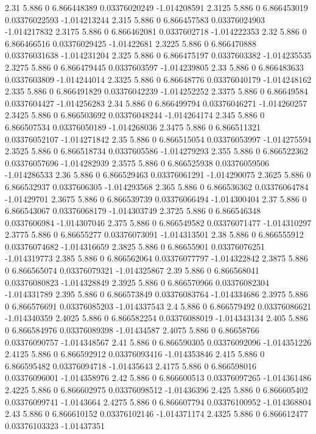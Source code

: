 {2.31 5.886 0 6.866448389 0.03376020249 -1.014208591
2.3125 5.886 0 6.866453019 0.03376022593 -1.014213244
2.315 5.886 0 6.866457583 0.03376024903 -1.014217832
2.3175 5.886 0 6.866462081 0.0337602718 -1.014222353
2.32 5.886 0 6.866466516 0.03376029425 -1.01422681
2.3225 5.886 0 6.866470888 0.03376031638 -1.014231204
2.325 5.886 0 6.866475197 0.0337603382 -1.014235535
2.3275 5.886 0 6.866479445 0.0337603597 -1.014239805
2.33 5.886 0 6.866483633 0.0337603809 -1.014244014
2.3325 5.886 0 6.86648776 0.03376040179 -1.014248162
2.335 5.886 0 6.866491829 0.03376042239 -1.014252252
2.3375 5.886 0 6.86649584 0.0337604427 -1.014256283
2.34 5.886 0 6.866499794 0.03376046271 -1.014260257
2.3425 5.886 0 6.866503692 0.03376048244 -1.014264174
2.345 5.886 0 6.866507534 0.03376050189 -1.014268036
2.3475 5.886 0 6.866511321 0.03376052107 -1.014271842
2.35 5.886 0 6.866515054 0.03376053997 -1.014275594
2.3525 5.886 0 6.866518734 0.0337605586 -1.014279293
2.355 5.886 0 6.866522362 0.03376057696 -1.014282939
2.3575 5.886 0 6.866525938 0.03376059506 -1.014286533
2.36 5.886 0 6.866529463 0.03376061291 -1.014290075
2.3625 5.886 0 6.866532937 0.0337606305 -1.014293568
2.365 5.886 0 6.866536362 0.03376064784 -1.01429701
2.3675 5.886 0 6.866539739 0.03376066494 -1.014300404
2.37 5.886 0 6.866543067 0.03376068179 -1.014303749
2.3725 5.886 0 6.866546348 0.0337606984 -1.014307046
2.375 5.886 0 6.866549582 0.03376071477 -1.014310297
2.3775 5.886 0 6.86655277 0.03376073091 -1.014313501
2.38 5.886 0 6.866555912 0.03376074682 -1.014316659
2.3825 5.886 0 6.86655901 0.03376076251 -1.014319773
2.385 5.886 0 6.866562064 0.03376077797 -1.014322842
2.3875 5.886 0 6.866565074 0.03376079321 -1.014325867
2.39 5.886 0 6.866568041 0.03376080823 -1.014328849
2.3925 5.886 0 6.866570966 0.03376082304 -1.014331789
2.395 5.886 0 6.866573849 0.03376083764 -1.014334686
2.3975 5.886 0 6.866576691 0.03376085203 -1.014337543
2.4 5.886 0 6.866579492 0.03376086621 -1.014340359
2.4025 5.886 0 6.866582254 0.03376088019 -1.014343134
2.405 5.886 0 6.866584976 0.03376089398 -1.01434587
2.4075 5.886 0 6.86658766 0.03376090757 -1.014348567
2.41 5.886 0 6.866590305 0.03376092096 -1.014351226
2.4125 5.886 0 6.866592912 0.03376093416 -1.014353846
2.415 5.886 0 6.866595482 0.03376094718 -1.01435643
2.4175 5.886 0 6.866598016 0.03376096001 -1.014358976
2.42 5.886 0 6.866600513 0.03376097265 -1.014361486
2.4225 5.886 0 6.866602975 0.03376098512 -1.01436396
2.425 5.886 0 6.866605402 0.03376099741 -1.0143664
2.4275 5.886 0 6.866607794 0.03376100952 -1.014368804
2.43 5.886 0 6.866610152 0.03376102146 -1.014371174
2.4325 5.886 0 6.866612477 0.03376103323 -1.01437351
}
